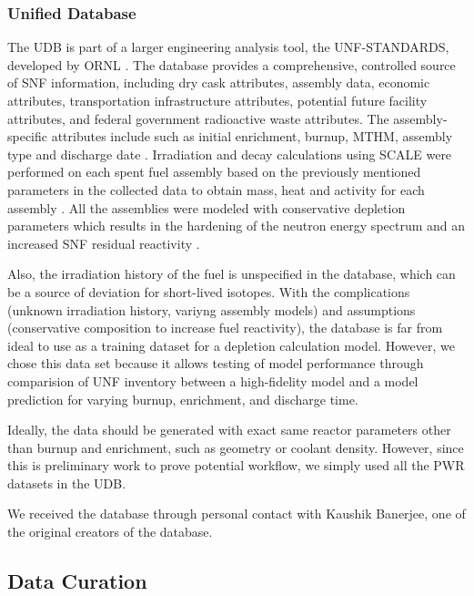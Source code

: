 \subsubsection{Unified Database}
The \gls{UDB} is part of a larger engineering
analysis tool, the \gls{UNF-STANDARDS}, developed
by \gls{ORNL} \cite{peterson_used_2013}.  
The database provides a comprehensive, controlled
source of \gls{SNF} information, including
dry cask attributes, assembly data, economic attributes,
transportation infrastructure attributes, potential future
facility attributes, and federal government radioactive
waste attributes. 
The assembly-specific attributes include 
such as initial enrichment, burnup, \gls{MTHM}, assembly 
type and discharge date \cite{peterson_fuel_2015}. 
Irradiation and decay calculations using SCALE 
\cite{bowman_scale_2011} were performed on each 
spent fuel assembly based on the previously mentioned 
parameters in the collected data to obtain mass, heat 
and activity for each assembly \cite{peterson_additional_2017}. 
All the assemblies were modeled with conservative 
depletion parameters which results in the hardening of 
the neutron energy spectrum and an increased \gls{SNF} 
residual reactivity \cite{peterson_additional_2017}. 

Also, the irradiation history of the fuel is unspecified in the
database, which can be a source of deviation for short-lived isotopes.
With the complications (unknown irradiation history, variyng
assembly models) and assumptions (conservative composition to
increase fuel reactivity), the database is far from ideal to use
as a training dataset for a depletion calculation model. However,
we chose this data set because it allows testing of model performance
through comparision of \gls{UNF}
inventory between a high-fidelity model and a model prediction for
varying burnup, enrichment, and discharge time.

Ideally, the data should be generated with exact same reactor
parameters other than burnup and enrichment, such as geometry or
coolant density. However, since
this is preliminary work to prove potential workflow, we
simply used all the \gls{PWR} datasets in the \gls{UDB}.

We received the database through personal contact with
Kaushik Banerjee, one of the original creators of the database.

\subsection{Data Curation}

